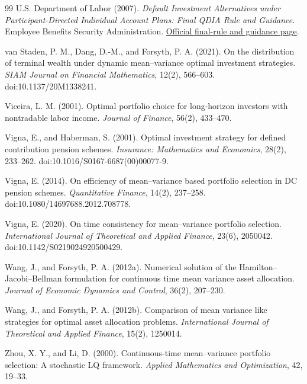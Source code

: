 \documentclass[10pt,a4paper]{article}
\theoremstyle{plain}
\theoremstyle{definition}
\begin{document}
\begin{thebibliography}{99}
U.S. Department of Labor (2007).
\emph{Default Investment Alternatives under Participant-Directed Individual Account Plans: Final QDIA Rule and Guidance}.
Employee Benefits Security Administration.
\href{https://www.dol.gov/agencies/ebsa/laws-and-regulations/laws/pension-protection-act}{Official final-rule and guidance page}.

van Staden, P. M., Dang, D.-M., and Forsyth, P. A. (2021).
On the distribution of terminal wealth under dynamic mean--variance optimal investment strategies.
\emph{SIAM Journal on Financial Mathematics}, 12(2), 566--603.
doi:10.1137/20M1338241.

Viceira, L. M. (2001).
Optimal portfolio choice for long-horizon investors with nontradable labor income.
\emph{Journal of Finance}, 56(2), 433--470.

Vigna, E., and Haberman, S. (2001).
Optimal investment strategy for defined contribution pension schemes.
\emph{Insurance: Mathematics and Economics}, 28(2), 233--262.
doi:10.1016/S0167-6687(00)00077-9.

Vigna, E. (2014).
On efficiency of mean--variance based portfolio selection in DC pension schemes.
\emph{Quantitative Finance}, 14(2), 237--258.
doi:10.1080/14697688.2012.708778.

Vigna, E. (2020).
On time consistency for mean--variance portfolio selection.
\emph{International Journal of Theoretical and Applied Finance}, 23(6), 2050042.
doi:10.1142/S0219024920500429.

Wang, J., and Forsyth, P. A. (2012a).
Numerical solution of the Hamilton--Jacobi--Bellman formulation for continuous time mean variance asset allocation.
\emph{Journal of Economic Dynamics and Control}, 36(2), 207--230.

Wang, J., and Forsyth, P. A. (2012b).
Comparison of mean variance like strategies for optimal asset allocation problems.
\emph{International Journal of Theoretical and Applied Finance}, 15(2), 1250014.

Zhou, X. Y., and Li, D. (2000).
Continuous-time mean--variance portfolio selection: A stochastic LQ framework.
\emph{Applied Mathematics and Optimization}, 42, 19--33.
\end{thebibliography}
\endgroup
\end{document}
